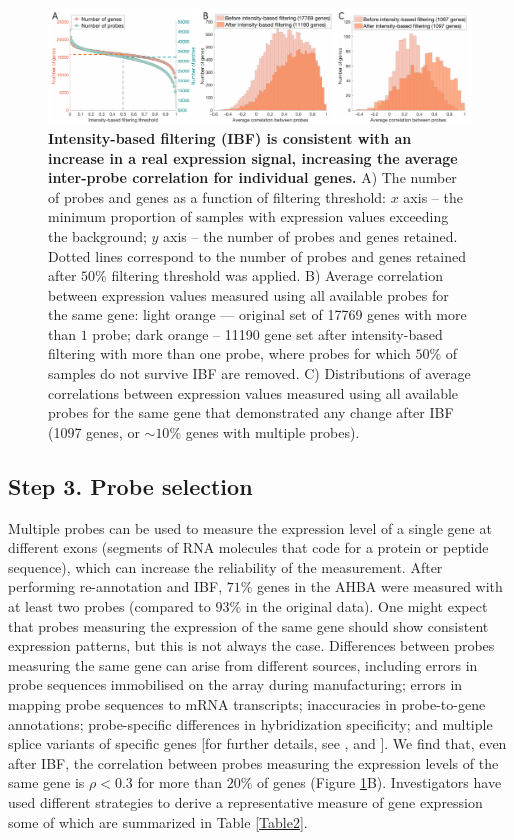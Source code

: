 \documentclass[10pt,A4]{article}
\begin{document}
\begin{figure}[h!]
  \centering
    \includegraphics[width=1\textwidth]{Ch4Fig3.pdf}
\caption{\textbf{Intensity-based filtering (IBF) is consistent with an increase in a real expression signal, increasing the average inter-probe correlation for individual genes.} A) The number of probes and genes as a function of filtering threshold: $x$ axis – the minimum proportion of samples with expression values exceeding the background; $y$ axis – the number of probes and genes retained. Dotted lines correspond to the number of probes and genes retained after $50\%$ filtering threshold was applied.
B) Average correlation between expression values measured using all available probes for the same gene: light orange --- original set of \num{17769} genes with more than $1$ probe; dark orange – \num{11190} gene set after intensity-based filtering with more than one probe, where probes for which $50\%$ of samples do not survive IBF are removed.
C) Distributions of average correlations between expression values measured using all available probes for the same gene that demonstrated any change after IBF (\num{1097} genes, or $\sim10\%$ genes with multiple probes). }

\label{fig:Ch4Fig3}
\end{figure}

\subsection*{Step 3. Probe selection}

Multiple probes can be used to measure the expression level of a single gene at different exons (segments of RNA molecules that code for a protein or peptide sequence), which can increase the reliability of the measurement. After performing re-annotation and IBF, $71\%$ genes in the AHBA were measured with at least two probes (compared to $93\%$ in the original data). One might expect that probes measuring the expression of the same gene should show consistent expression patterns, but this is not always the case. Differences between probes measuring the same gene can arise from different sources, including errors in probe sequences immobilised on the array during manufacturing; errors in mapping probe sequences to mRNA transcripts; inaccuracies in probe-to-gene annotations; probe-specific differences in hybridization specificity; and multiple splice variants of specific genes [for further details, see \citet{Liu2010}, and \citep{Jaksik2015}]. We find that, even after IBF, the correlation between probes measuring the expression levels of the same gene is $\rho < 0.3$ for more than $20\%$ of genes (Figure \ref{fig:Ch4Fig3}B). Investigators have used different strategies to derive a representative measure of gene expression some of which are summarized in Table \ref{Table2}.
\end{document}
